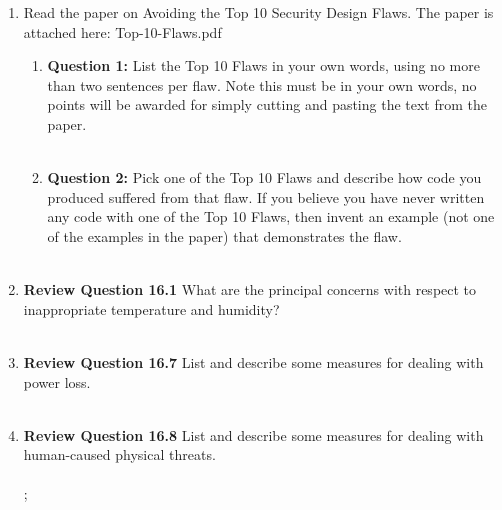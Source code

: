 \documentclass[12pt]{article}
\begin{document}
\renewcommand{\headrulewidth}{0.4pt}
\vspace{-3mm}
\begin{enumerate}
\item Read the paper on Avoiding the Top 10 Security Design Flaws.  The paper is attached here: Top-10-Flaws.pdf
\begin{enumerate}
  \item \textbf{Question 1:} List the Top 10 Flaws in your own words, using no more than two sentences per flaw. Note this must be in your own words, no points will be awarded for simply cutting and pasting the text from the paper. \\

  \textbf{} \\

  \item \textbf{Question 2:}  Pick one of the Top 10 Flaws and describe how code you produced suffered from that flaw.  If you believe you have never written any code with one of the Top 10 Flaws, then invent an example (not one of the examples in the paper) that demonstrates the flaw. \\

  \textbf{} \\

\end{enumerate}


  \item \textbf{Review Question 16.1} What are the principal concerns with respect to inappropriate temperature and humidity?\\

  \textbf{} \\

  \item \textbf{Review Question 16.7} List and describe some measures for dealing with power loss. \\

  \textbf{} \\

  \item \textbf{Review Question 16.8} List and describe some measures for dealing with human-caused physical threats. \\

  \textbf{} \\;

\end{enumerate}
\end{document}
